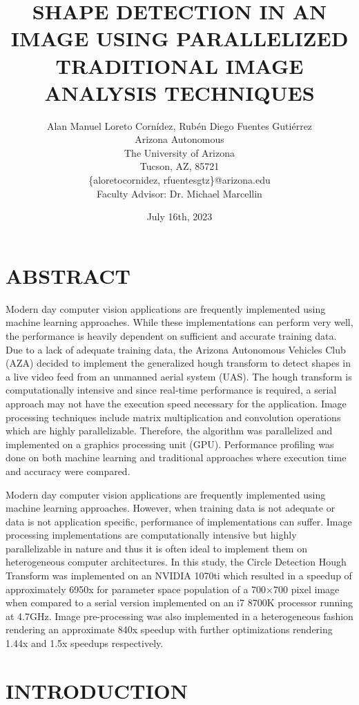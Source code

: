 \documentclass[12pt]{article}
\title{\Large \vspace{-0.5in}
\MakeUppercase{Shape Detection in an Image using Parallelized Traditional Image Analysis Techniques}}
\author{Alan Manuel Loreto Cornídez, Rubén Diego Fuentes Gutiérrez\\
    \normalsize Arizona Autonomous\\
    \normalsize The University of Arizona\\
    \normalsize Tucson, AZ, 85721\\
    \normalsize \{aloretocornidez, rfuentesgtz\}@arizona.edu\\[6pt]
    Faculty Advisor: Dr. Michael Marcellin\\
    }
\date{July 16th, 2023}
\begin{document}
\maketitle %





\section{\MakeUppercase{Abstract}}
\noindent
Modern day computer vision applications are frequently implemented using machine learning approaches.
While these implementations can perform very well, the performance is heavily dependent on sufficient and accurate training data.
Due to a lack of adequate training data, the Arizona Autonomous Vehicles Club (AZA) decided to implement the generalized hough transform to detect shapes in a live video feed from an unmanned aerial system (UAS).
The hough transform is computationally intensive and since real-time performance is required, a serial approach may not have the execution speed necessary for the application.
Image processing techniques include matrix multiplication and convolution operations which are highly parallelizable.
Therefore, the algorithm was parallelized and implemented on a graphics processing unit (GPU).
Performance profiling was done on both machine learning and traditional approaches where execution time and accuracy were compared.

Modern day computer vision applications are frequently implemented using machine learning approaches.
However, when training data is not adequate or data is not application specific, performance of implementations can suffer.
Image processing implementations are computationally intensive but highly parallelizable in nature and thus it is often ideal to implement them on heterogeneous computer architectures.
In this study, the Circle Detection Hough Transform was implemented on an NVIDIA 1070ti which resulted in a speedup of approximately 6950x for parameter space population of a 700$\times$700 pixel image when compared to a serial version implemented on an i7 8700K processor running at 4.7GHz.
Image pre-processing was also implemented in a heterogeneous fashion rendering an approximate 840x speedup with further optimizations rendering 1.44x and 1.5x speedups respectively. 




\section{\MakeUppercase{Introduction}}
\end{document}
